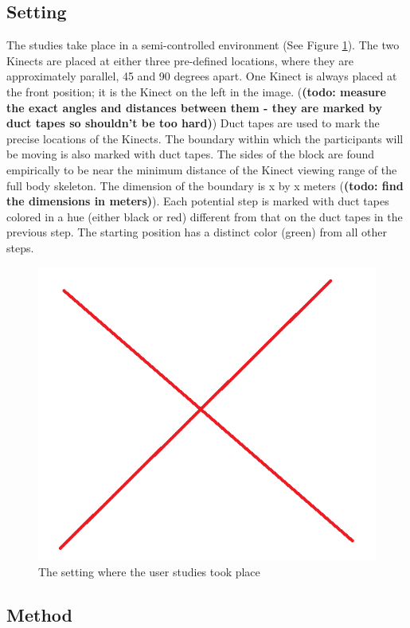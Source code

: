 \documentclass{sigchi}
\begin{document}
\subsection{Setting}

The studies take place in a semi-controlled environment (See Figure \ref{fig:studies_setting}). The two Kinects are placed at either three pre-defined locations, where they are approximately parallel, 45 and 90 degrees apart. One Kinect is always placed at the front position; it is the Kinect on the left in the image. (\textbf{(todo: measure the exact angles and distances between them - they are marked by duct tapes so shouldn't be too hard)}) Duct tapes are used to mark the precise locations of the Kinects. The boundary within which the participants will be moving is also marked with duct tapes. The sides of the block are found empirically to be near the minimum distance of the Kinect viewing range of the full body skeleton. The dimension of the boundary is x by x meters (\textbf{(todo: find the dimensions in meters)}). Each potential step is marked with duct tapes colored in a hue (either black or red) different from that on the duct tapes in the previous step. The starting position has a distinct color (green) from all other steps.

\begin{figure}[!h]
  \centering
  \includegraphics[width=0.9\columnwidth]{studies_setting}
  \caption{The setting where the user studies took place}
  \label{fig:studies_setting}
\end{figure}

\subsection{Method}
\end{document}
